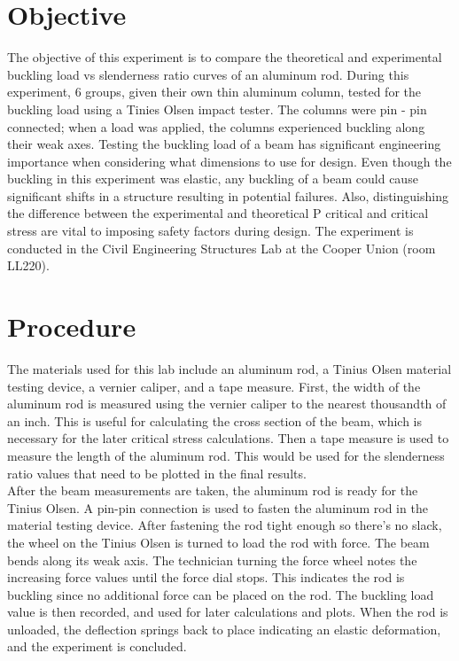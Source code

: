 \documentclass{article}
\begin{document}
    
    \doublespacing
    \tableofcontents
    \newpage
    \listoftables
    \listoffigures
    \newpage
    \section{Objective}
    \indent The objective of this experiment is to compare the theoretical and experimental buckling load vs slenderness ratio curves of an aluminum rod. During this experiment, 6 groups, given their own thin aluminum column, tested for the buckling load using a Tinies Olsen impact tester. The columns were pin - pin connected; when a load was applied, the columns experienced buckling along their weak axes. Testing the buckling load of a beam has significant engineering importance when considering what dimensions to use for design. Even though the buckling in this experiment was elastic, any buckling of a beam could cause significant shifts in a structure resulting in potential failures. Also, distinguishing the difference between the experimental and theoretical P critical and critical stress are vital to imposing safety factors during design. The experiment is conducted in the Civil Engineering Structures Lab at the Cooper Union (room LL220).
    \newpage
    \section{Procedure}
    \indent The materials used for this lab include an aluminum rod, a Tinius Olsen material testing device, a vernier caliper, and a tape measure. First, the width of the aluminum rod is measured using the vernier caliper to the nearest thousandth of an inch. This is useful for  calculating the cross section of the beam, which is necessary for the later critical stress calculations. Then a tape measure is used to measure the length of the aluminum rod. This would be used for the slenderness ratio values that need to be plotted in the final results.\\
    \indent After the beam measurements are taken, the aluminum rod is ready for the Tinius Olsen. A pin-pin connection is used to fasten the aluminum rod in the material testing device. After fastening the rod tight enough so there's no slack, the wheel on the Tinius Olsen is turned to load the rod with force. The beam bends along its weak axis. The technician turning the force wheel notes the increasing force values until the force dial stops. This indicates the rod is buckling since no additional force can be placed on the rod. The buckling load value is then  recorded, and used for later calculations and plots. When the rod is unloaded, the deflection springs back to place indicating an elastic deformation, and the experiment is concluded. 
\end{document}

